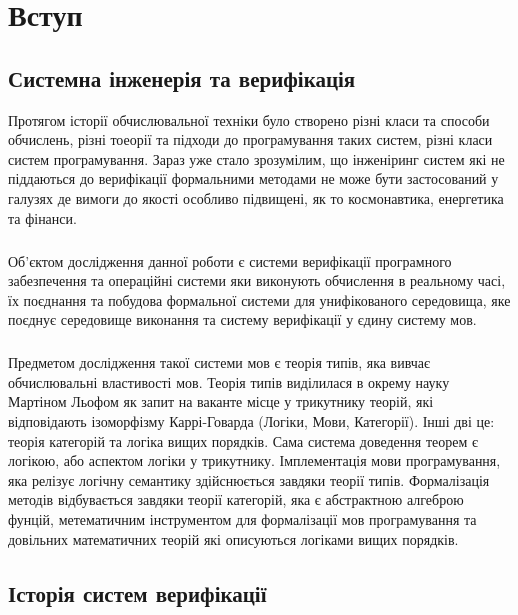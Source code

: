\chapter{Вступ}

\section{Системна інженерія та верифікація}

    Протягом історії обчислювальної техніки було створено різні класи та способи обчислень,
    різні тоеорії та підходи до програмування таких систем, різні класи систем програмування.
    Зараз уже стало зрозумілим, що інженіринг систем які не піддаються до верифікації
    формальними методами не може бути застосований у галузях де вимоги до якості
    особливо підвищені, як то космонавтика, енергетика та фінанси.

    \paragraph{}
    Об'єктом дослідження данної роботи є системи верифікації програмного забезпечення
    та операційні системи яки виконують обчислення в реальному часі, їх поєднання
    та побудова формальної системи для унифікованого середовища, яке поєднує
    середовище виконання та систему верифікації у єдину систему мов.

    \paragraph{}
    Предметом дослідження такої системи мов є теорія типів, яка вивчає обчислювальні властивості мов.
    Теорія типів виділилася в окрему науку Мартіном Льофом як запит на ваканте місце у
    трикутнику теорій, які відповідають ізоморфізму Каррі-Говарда (Логіки, Мови, Категорії).
    Інші дві це: теорія категорій та логіка вищих порядків. Сама система доведення теорем є
    логікою, або аспектом логіки у трикутнику. Імплементація мови програмування,
    яка релізує логічну семантику здійснюється завдяки теорії типів. Формалізація методів
    відбувається завдяки теорії категорій, яка є абстрактною алгеброю фунцій,
    метематичним інструментом для формалізації мов програмування та довільних
    математичних теорій які описуються логіками вищих порядків.

\newpage
\section{Історія систем верифікації}

